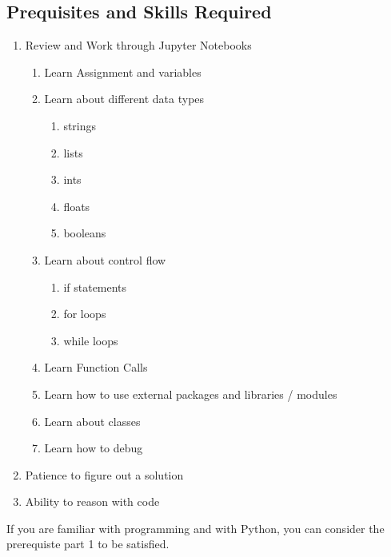 \documentclass[
]{article}
\providecommand{\tightlist}{%
  \setlength{\itemsep}{0pt}\setlength{\parskip}{0pt}}
\begin{document}
\hypertarget{prequisites-and-skills-required}{%
\subsection{Prequisites and Skills
Required}\label{prequisites-and-skills-required}}

\begin{enumerate}
\def\labelenumi{\arabic{enumi}.}
\tightlist
\item
  Review and Work through Jupyter Notebooks

  \begin{enumerate}
  \def\labelenumii{\arabic{enumii}.}
  \tightlist
  \item
    Learn Assignment and variables
  \item
    Learn about different data types

    \begin{enumerate}
    \def\labelenumiii{\arabic{enumiii}.}
    \tightlist
    \item
      strings
    \item
      lists
    \item
      ints
    \item
      floats
    \item
      booleans
    \end{enumerate}
  \item
    Learn about control flow

    \begin{enumerate}
    \def\labelenumiii{\arabic{enumiii}.}
    \tightlist
    \item
      if statements
    \item
      for loops
    \item
      while loops
    \end{enumerate}
  \item
    Learn Function Calls
  \item
    Learn how to use external packages and libraries / modules
  \item
    Learn about classes
  \item
    Learn how to debug
  \end{enumerate}
\item
  Patience to figure out a solution
\item
  Ability to reason with code
\end{enumerate}

If you are familiar with programming and with Python, you can consider
the prerequiste part 1 to be satisfied.
\end{document}
